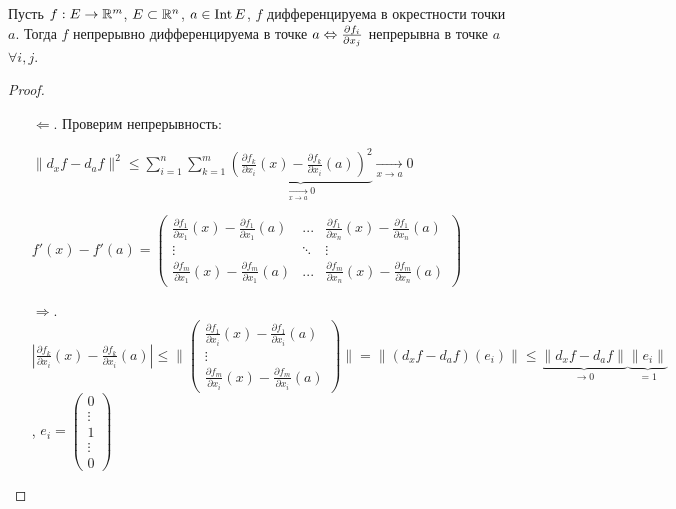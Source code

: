 \begin{theorem}
    Пусть $f: E\rightarrow \mathbb{R}^m$, $E\subset \mathbb{R}^n$, $a\in \operatorname{Int} E$, $f$ дифференцируема в окрестности точки $a$. Тогда $f$ непрерывно дифференцируема в точке $a\Leftrightarrow\pdv{f_i}{x_j}$ непрерывна в точке $a$ $\forall i, j$. 
\end{theorem}
\begin{proof}~
    \begin{enumerate}
        \item[$\Leftarrow$.]  Проверим непрерывность:
        
        $\|d_xf - d_af\|^2\leq \sum\limits_{i=1}^n\sum\limits_{k=1}^m\underbrace{(\frac{\partial f_k}{\partial x_i}(x)-\frac{\partial f_k}{\partial x_i}(a))^2}_{\underset{x\rightarrow a}{\rightarrow} 0}\underset{x\rightarrow a}{\rightarrow} 0$

        $f'(x)-f'(a)=\begin{pmatrix}
            \frac{\partial f_1}{\partial x_1}(x)-\frac{\partial f_1}{\partial x_1}(a) & ... & \frac{\partial  f_1}{\partial x_n}(x)-\frac{\partial f_1}{\partial x_n}(a) \\
            \vdots & \ddots & \vdots \\
            \frac{\partial f_m}{\partial x_1}(x)-\frac{\partial f_m}{\partial x_1}(a) & ... & \frac{\partial f_m}{\partial x_n}(x)-\frac{\partial f_m}{\partial x_n}(a) 
        \end{pmatrix}$
        \item[$\Rightarrow$.] $|\frac{\partial f_k}{\partial x_i}(x)-\frac{\partial f_k}{\partial x_i}(a)|\leq \|\begin{pmatrix}
            \frac{\partial f_1}{\partial x_i}(x)-\frac{\partial f_1}{\partial x_i}(a) \\
            \vdots \\
            \frac{\partial f_m}{\partial x_i}(x)-\frac{\partial f_m}{\partial x_i}(a)
        \end{pmatrix}\|=\|(d_xf-d_af)(e_i)\|\leq \underbrace{\|d_x f-d_af\|}_{\rightarrow 0}\underbrace{\|e_i\|}_{=1}$, $e_i=\begin{pmatrix}
            0 \\ \vdots \\ 1 \\ \vdots \\ 0
        \end{pmatrix}$
    \end{enumerate}
\end{proof}

